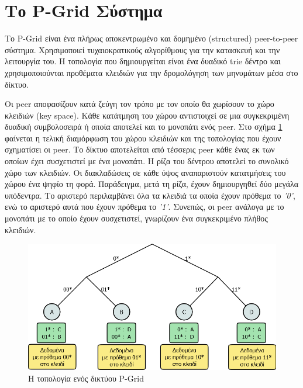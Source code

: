 \section{Το P-Grid Σύστημα}

Το P-Grid 
\citep{Abererb, Aberer, Abererc, Abererd, Aberer2004, Aberer2003, Aberere, Aberer2002} 
είναι ένα πλήρως αποκεντρωμένο και δομημένο 
(structured) peer-to-peer σύστημα. Χρησιμοποιεί τυχαιοκρατικούς 
αλγορίθμους για την κατασκευή και την λειτουργία του. Η τοπολογία που 
δημιουργείται είναι ένα δυαδικό trie δέντρο και χρησιμοποιούνται 
προθέματα κλειδιών για την δρομολόγηση των μηνυμάτων μέσα στο δίκτυο.

Οι peer αποφασίζουν κατά ζεύγη τον τρόπο με τον οποίο θα 
χωρίσουν το χώρο κλειδιών (key space). Κάθε κατάτμηση του χώρου 
αντιστοιχεί σε μια συγκεκριμένη δυαδική συμβολοσειρά ή οποία αποτελεί 
και το μονοπάτι ενός peer. Στο σχήμα \ref{fig:PGrid_overlay} φαίνεται η τελική 
διαμόρφωση του χώρου κλειδιών και της τοπολογίας που έχουν σχηματίσει οι 
peer. Το δίκτυο αποτελείται από τέσσερις peer κάθε ένας εκ των οποίων 
έχει συσχετιστεί με ένα μονοπάτι. Η ρίζα του δέντρου αποτελεί το 
συνολικό χώρο των κλειδιών. Οι διακλαδώσεις σε κάθε ύψος αναπαριστούν 
κατατμήσεις του χώρου ένα ψηφίο τη φορά. Παράδειγμα, μετά τη ρίζα, 
έχουν δημιουργηθεί δύο μεγάλα υπόδεντρα. Το αριστερό περιλαμβάνει όλα τα 
κλειδιά τα οποία έχουν πρόθεμα το \textit{'0'}, ενώ το αριστερό αυτά που έχουν 
πρόθεμα το \textit{'1'}. Συνεπώς, οι peer ανάλογα με το μονοπάτι με το οποίο 
έχουν συσχετιστεί, γνωρίζουν ένα συγκεκριμένο πλήθος κλειδιών.

\begin{figure}[htbp]
\centering
\includegraphics[scale=0.4]{Figures/P2P_PGrid/PGrid_overlay_network.png}
\caption{Η τοπολογία ενός δικτύου P-Grid}
\label{fig:PGrid_overlay}
\end{figure}

